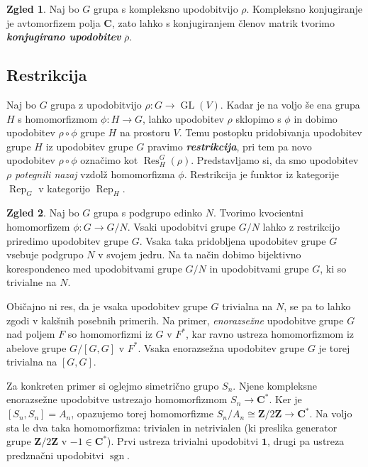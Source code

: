 \documentclass[11pt]{book}
\def\ZZ{\mathbf{Z}}
\def\CC{\mathbf{C}}
\def\11{\mathbf{1}}
\DeclareMathOperator\sgn{sgn}
\DeclareMathOperator\Res{Res}
\DeclareMathOperator\Rep{Rep}
\DeclareMathOperator\GL{GL}
\def\definicija{\color{rdeca}\bf\em}
\theoremstyle{definition}
\theoremstyle{zgled}
\newtheorem*{zgled}{Zgled}
\theoremstyle{odprtproblem}
\theoremstyle{domacanaloga}
\theoremstyle{izrek}
\begin{document}
\begin{zgled}
Naj bo $G$ grupa s kompleksno upodobitvijo $\rho$. Kompleksno konjugiranje je avtomorfizem polja $\CC$, zato lahko s konjugiranjem členov matrik tvorimo {\definicija konjugirano upodobitev} $\overline{\rho}$.
\end{zgled}


\subsection{Restrikcija}

Naj bo $G$ grupa z upodobitvijo $\rho \colon G \to \GL(V)$. Kadar je na voljo še ena grupa $H$ s homomorfizmom $\phi \colon H \to G$, lahko upodobitev $\rho$ sklopimo s $\phi$ in dobimo upodobitev $\rho \circ \phi$ grupe $H$ na prostoru $V$. Temu postopku pridobivanja upodobitev grupe $H$ iz upodobitev grupe $G$ pravimo {\definicija restrikcija}, pri tem pa novo upodobitev $\rho \circ \phi$ označimo kot $\Res^G_H(\rho)$. Predstavljamo si, da smo upodobitev $\rho$ \emph{potegnili nazaj} vzdolž homomorfizma $\phi$. Restrikcija je funktor iz kategorije $\Rep_G$ v kategorijo $\Rep_H$.

\begin{zgled}
Naj bo $G$ grupa s podgrupo edinko $N$. Tvorimo kvocientni homomorfizem $\phi \colon G \to G/N$. Vsaki upodobitvi grupe $G/N$ lahko z restrikcijo priredimo upodobitev grupe $G$. Vsaka taka pridobljena upodobitev grupe $G$ vsebuje podgrupo $N$ v svojem jedru. Na ta način dobimo bijektivno korespondenco med upodobitvami grupe $G/N$ in upodobitvami grupe $G$, ki so trivialne na $N$.

Običajno ni res, da je vsaka upodobitev grupe $G$ trivialna na $N$, se pa to lahko zgodi v kakšnih posebnih primerih. Na primer, \emph{enorazsežne} upodobitve grupe $G$ nad poljem $F$ so homomorfizmi iz $G$ v $F^*$, kar ravno ustreza homomorfizmom iz abelove grupe $G/[G,G]$ v $F^*$. Vsaka enorazsežna upodobitev grupe $G$ je torej trivialna na $[G,G]$.

Za konkreten primer si oglejmo simetrično grupo $S_n$. Njene kompleksne enorazsežne upodobitve ustrezajo homomorfizmom $S_n \to \CC^*$. Ker je $[S_n, S_n] = A_n$, opazujemo torej homomorfizme $S_n/A_n \cong \ZZ/2\ZZ \to \CC^*$. Na voljo sta le dva taka homomorfizma: trivialen in netrivialen (ki preslika generator grupe $\ZZ/2\ZZ$ v $-1 \in \CC^*$). Prvi ustreza trivialni upodobitvi $\11$, drugi pa ustreza predznačni upodobitvi $\sgn$.
\end{zgled}
\end{document}
